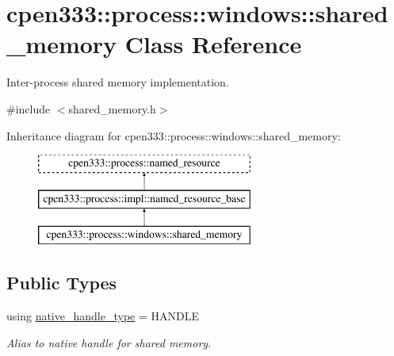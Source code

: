 \hypertarget{classcpen333_1_1process_1_1windows_1_1shared__memory}{}\section{cpen333\+:\+:process\+:\+:windows\+:\+:shared\+\_\+memory Class Reference}
\label{classcpen333_1_1process_1_1windows_1_1shared__memory}


Inter-\/process shared memory implementation.  




{\ttfamily \#include $<$shared\+\_\+memory.\+h$>$}

Inheritance diagram for cpen333\+:\+:process\+:\+:windows\+:\+:shared\+\_\+memory\+:\begin{figure}[H]
\begin{center}
\leavevmode
\includegraphics[height=3.000000cm]{classcpen333_1_1process_1_1windows_1_1shared__memory}
\end{center}
\end{figure}
\subsection*{Public Types}
\begin{DoxyCompactItemize}
\item 
\mbox{\label{classcpen333_1_1process_1_1windows_1_1shared__memory_a92d977097375f7b87d5702b7da666267}} 
using \hyperlink{classcpen333_1_1process_1_1windows_1_1shared__memory_a92d977097375f7b87d5702b7da666267}{native\+\_\+handle\+\_\+type} = H\+A\+N\+D\+LE
\begin{DoxyCompactList}\small\item\em Alias to native handle for shared memory. \end{DoxyCompactList}\end{DoxyCompactItemize}
